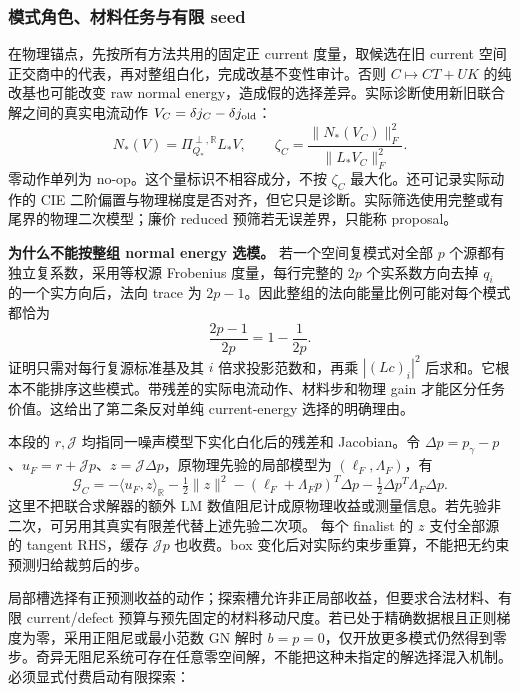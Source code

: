 \documentclass[10pt,a4paper]{article}
\begin{document}
\hypertarget{ux6a21ux5f0fux89d2ux8272ux6750ux6599ux4efbux52a1ux4e0eux6709ux9650-seed}{%
\subsubsection{模式角色、材料任务与有限
seed}\label{ux6a21ux5f0fux89d2ux8272ux6750ux6599ux4efbux52a1ux4e0eux6709ux9650-seed}}

在物理锚点，先按所有方法共用的固定正 current 度量，取候选在旧 current
空间正交商中的代表，再对整组白化，完成改基不变性审计。否则
\(C\mapsto CT+UK\) 的纯改基也可能改变 raw normal
energy，造成假的选择差异。实际诊断使用新旧联合解之间的真实电流动作
\(V_C=\delta j_C-\delta j_{\rm old}\)：
\[N_*(V)=\Pi_{Q_*}^{\perp,\mathbb R}L_*V,\qquad
\zeta_C=\frac{\|N_*(V_C)\|_F^2}{\|L_*V_C\|_F^2}.\] 零动作单列为
no-op。这个量标识不相容成分，不按 \(\zeta_C\) 最大化。还可记录实际动作的
CIE
二阶偏置与物理梯度是否对齐，但它只是诊断。实际筛选使用完整或有尾界的物理二次模型；廉价
reduced 预筛若无误差界，只能称 proposal。

\textbf{为什么不能按整组 normal energy 选模。} 若一个空间复模式对全部
\(p\) 个源都有独立复系数，采用等权源 Frobenius 度量，每行完整的 \(2p\)
个实系数方向去掉 \(q_i\) 的一个实方向后，法向 trace 为
\(2p-1\)。因此整组的法向能量比例可能对每个模式都恰为
\[\frac{2p-1}{2p}=1-\frac1{2p}.\] 证明只需对每行复源标准基及其 \(i\)
倍求投影范数和，再乘 \(|(L c)_i|^2\)
后求和。它根本不能排序这些模式。带残差的实际电流动作、材料步和物理 gain
才能区分任务价值。这给出了第二条反对单纯 current-energy 选择的明确理由。

本段的 \(r,\mathcal J\) 均指同一噪声模型下实化白化后的残差和
Jacobian。令
\(\Delta p=p_\gamma-p\)、\(u_F=r+\mathcal Jp\)、\(z=\mathcal J\Delta p\)，原物理先验的局部模型为
\((\ell_F,\Lambda_F)\)，有
\[\mathcal G_C=-\langle u_F,z\rangle_{\mathbb R}-\tfrac12\|z\|^2
-(\ell_F+\Lambda_Fp)^T\Delta p-\tfrac12\Delta p^T\Lambda_F\Delta p.\]
这里不把联合求解器的额外 LM
数值阻尼计成原物理收益或测量信息。若先验非二次，可另用其真实有限差代替上述先验二次项。
每个 finalist 的 \(z\) 支付全部源的 tangent RHS，缓存 \(\mathcal Jp\)
也收费。box 变化后对实际约束步重算，不能把无约束预测归给裁剪后的步。

局部槽选择有正预测收益的动作；探索槽允许非正局部收益，但要求合法材料、有限
current/defect
预算与预先固定的材料移动尺度。若已处于精确数据根且正则梯度为零，采用正阻尼或最小范数
GN 解时
\(b=p=0\)，仅开放更多模式仍然得到零步。奇异无阻尼系统可存在任意零空间解，不能把这种未指定的解选择混入机制。必须显式付费启动有限探索：
\end{document}
